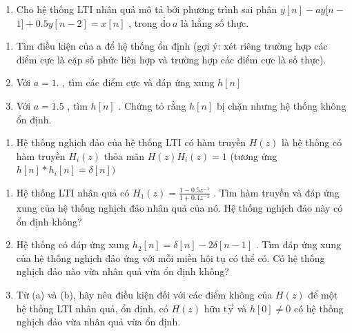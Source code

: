 \documentclass[
  10
]{article}
\providecommand{\tightlist}{%
  \setlength{\itemsep}{0pt}\setlength{\parskip}{0pt}}
\begin{document}
\begin{enumerate}
\def\labelenumi{\arabic{enumi}.}
\setcounter{enumi}{14}
\tightlist
\item
  Cho hệ thống LTI nhân quả mô tả bởi phương trình sai phân
  \(y [ n ] - a y [ n -\) \(1 ] + 0 . 5 y [ n - 2 ] = x [ n ]\) , trong
  \(\scriptstyle { \dot { \mathrm { d o ~ } } } a\) là hằng số thực.
\end{enumerate}

\begin{enumerate}
\def\labelenumi{(\alph{enumi})}
\item
  Tìm điều kiện của a để hệ thống ổn định (gợi ý: xét riêng trường hợp
  các điểm cực là cặp số phức liên hợp và trường hợp các điểm cực là số
  thực).
\item
  Với \(a = 1 .\) , tìm các điểm cực và đáp ứng xung \(h [ n ]\)
\item
  Với \(a = 1 . 5\) , tìm \(h [ n ]\) . Chứng tỏ rằng \(h [ n ]\) bị
  chặn nhưng hệ thống không ổn định.
\end{enumerate}

\begin{enumerate}
\def\labelenumi{\arabic{enumi}.}
\setcounter{enumi}{15}
\tightlist
\item
  Hệ thống nghịch đảo của hệ thống LTI có hàm truyền \(H ( z )\) là hệ
  thống có hàm truyền \(H _ { i } ( z )\) thỏa mãn
  \(H ( z ) H _ { i } ( z ) = 1\) (tương ứng
  \(h [ n ] * h _ { i } [ n ] = \delta [ n ] )\)
\end{enumerate}

\begin{enumerate}
\def\labelenumi{(\alph{enumi})}
\item
  Hệ thống LTI nhân quả có
  \(H _ { 1 } ( z ) = \frac { 1 - 0 . 5 z ^ { - 1 } } { 1 + 0 . 4 z ^ { - 1 } }\)
  . Tìm hàm truyền và đáp ứng xung của hệ thống nghịch đảo nhân quả của
  nó. Hệ thống nghịch đảo này có ổn định không?
\item
  Hệ thống có đáp ứng xung
  \(h _ { 2 } [ n ] = \delta [ n ] - 2 \delta [ n - 1 ]\) . Tìm đáp ứng
  xung của hệ thống nghịch đảo ứng với mỗi miền hội tụ có thể có. Có hệ
  thống nghịch đảo nào vừa nhân quả vừa ổn định không?
\item
  Từ (a) và (b), hãy nêu điều kiện đối với các điểm không của
  \(H ( z )\) để một hệ thống LTI nhân quả, ổn định, có \(H ( z )\) hữu
  \(\mathrm { t \vec { y } }\) và \(h [ 0 ] \neq 0\) có hệ thống nghịch
  đảo vừa nhân quả vừa ổn định.
\end{enumerate}
\end{document}

